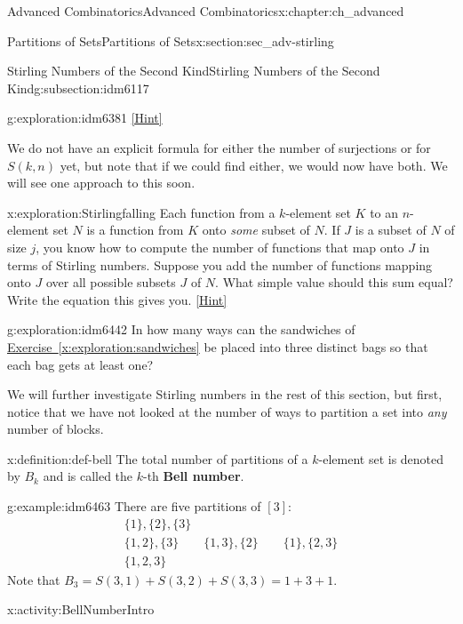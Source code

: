 \documentclass[oneside,10pt,]{book}
\newcommand{\terminology}[1]{\textbf{#1}}
\numberwithin{equation}{chapter}
\begin{document}
\begin{chapterptx}{Advanced Combinatorics}{}{Advanced Combinatorics}{}{}{x:chapter:ch_advanced}
\begin{sectionptx}{Partitions of Sets}{}{Partitions of Sets}{}{}{x:section:sec_adv-stirling}
\begin{subsectionptx}{Stirling Numbers of the Second Kind}{}{Stirling Numbers of the Second Kind}{}{}{g:subsection:idm6117}
\begin{exploration}{}{g:exploration:idm6381}
\space\hspace*{0pt}\hfill{\tiny\hyperlink{g:hint:idm6402-back}{[Hint]}}\end{exploration}
We do not have an explicit formula for either the number of surjections or for \(S(k,n)\) yet, but note that if we could find either, we would now have both.  We will see one approach to this soon.%
\begin{exploration}{}{x:exploration:Stirlingfalling}%
Each function from a \(k\)-element set \(K\) to an \(n\)-element set \(N\) is a function from \(K\) onto \emph{some} subset of \(N\). If \(J\) is a subset of \(N\) of size \(j\), you know how to compute the number of functions that map onto \(J\) in terms of Stirling numbers. Suppose you add the number of functions mapping onto \(J\) over all possible subsets \(J\) of \(N\). What simple value should this sum equal? Write the equation this gives you.%
\space\hspace*{0pt}\hfill{\tiny\hyperlink{g:hint:idm6431-back}{[Hint]}}\end{exploration}
\begin{exploration}{}{g:exploration:idm6442}%
In how many ways can the sandwiches of \hyperref[x:exploration:sandwiches]{Exercise~\ref{x:exploration:sandwiches}} be placed into three distinct bags so that each bag gets at least one?%
\end{exploration}
We will further investigate Stirling numbers in the rest of this section, but first, notice that we have not looked at the number of ways to partition a set into \emph{any} number of blocks.%
\begin{definition}{}{x:definition:def-bell}%
%
%
The total number of partitions of a \(k\)-element set is denoted by \(B_k\) and is called the \(k\)-th \terminology{Bell number}.%
\end{definition}
\begin{example}{}{g:example:idm6463}%
There are five partitions of \([3]\):%
\begin{gather*}
\{1\}, \{2\},\{3\}\\
\{1,2\},\{3\} \qquad \{1,3\},\{2\} \qquad \{1\}, \{2,3\}\\
\{1,2,3\}
\end{gather*}
Note that \(B_3 = S(3,1)+S(3,2)+S(3,3) = 1 + 3 + 1\).%
\end{example}
\begin{activity}{}{x:activity:BellNumberIntro}%
\begin{enumerate}[font=\bfseries,label=(\alph*),ref=\alph*]

\end{enumerate}
\end{activity}
\end{subsectionptx}
\end{sectionptx}
\end{chapterptx}
\end{document}
